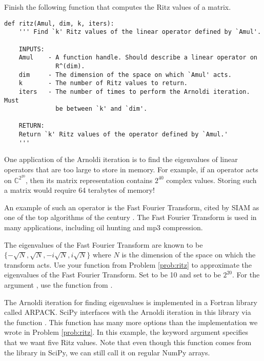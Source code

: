\begin{problem}\label{prob:ritz}
Finish the following function that computes the Ritz values of a matrix.
\begin{lstlisting}
def ritz(Amul, dim, k, iters):
    ''' Find `k' Ritz values of the linear operator defined by `Amul'.
    
    INPUTS:
    Amul    - A function handle. Should describe a linear operator on 
              R^(dim).
    dim     - The dimension of the space on which `Amul' acts.
    k 	    - The number of Ritz values to return.
    iters   - The number of times to perform the Arnoldi iteration. Must 
              be between `k' and `dim'.
    
    RETURN:
    Return `k' Ritz values of the operator defined by `Amul.' 
    '''
\end{lstlisting}
\end{problem}

One application of the Arnoldi iteration is to find the eigenvalues of linear operators that are too large to store in memory.
For example, if an operator acts on $\mathbb{C}^{2^{20}}$, then its matrix representation contains $2^{40}$ complex values.
Storing such a matrix would require 64 terabytes of memory!

An example of such an operator is the Fast Fourier Transform, cited by SIAM as one of the top algorithms of the century \cite{Cipra2000}.
The Fast Fourier Transform is used in many applications, including oil hunting and mp3 compression.


\begin{problem}
\label{prob:fourier_eigs}
The eigenvalues of the Fast Fourier Transform are known to be $\{ -\sqrt{N}, \sqrt{N}, -i\sqrt{N}, i\sqrt{N} \}$ where $N$ is the dimension of the space on which the transform acts.
Use your function  from Problem \ref{prob:ritz} to approximate the eigenvalues of the Fast Fourier Transform.
Set  to be 10 and set  to be $2^{20}$.
For the argument , use the  function from .
\end{problem}

The Arnoldi iteration for finding eigenvalues is implemented in a Fortran library called ARPACK. 
SciPy interfaces with the Arnoldi iteration in this library via the function .
This function has many more options than the implementation we wrote in Problem \ref{prob:ritz}.
In this example, the keyword argument  specifies that we want five Ritz values.
Note that even though this function comes from the  library in SciPy, we can still call it on regular NumPy arrays.

